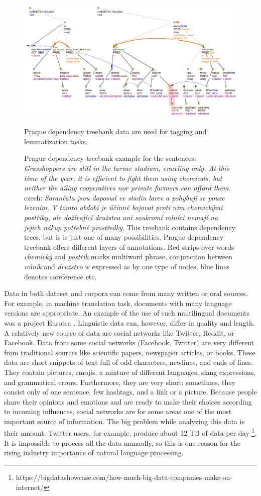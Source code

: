 \begin{figure}
\includegraphics[width=1\textwidth]{../img/prague_dep_treebank.png}
\caption{
Prague dependency treebank example \cite{PDT35} for the sentences:
\textit{Grasshoppers are still in the larvae stadium, crawling only. At this time of the year, it is efficient to fight them using chemicals, but neither the ailing cooperatives nor private farmers can afford them.} czech: \textit{Sarančata jsou doposud ve stadiu larev a pohybují se pouze lezením. V tomto období je účinné bojovat proti nim chemickými postřiky, ale dožívající družstva ani soukromí rolníci nemají na jejich nákup potřebné prostředky}. This treebank contains dependency trees, but is is just one of many possibilities. Prague dependency treebank offers different layers of annotations. Red strips over words \textit{chemický} and \textit{postřik} marks multiword phrase, conjunction between \textit{rolník} and \textit{družstvo} is expressed as by one type of nodes, blue lines denotes coreference etc.} Praque dependency treebank data are used for tagging and lemmatization tasks.
\label{fig:pdt}
\end{figure}

Data in both dataset and corpora can come from many written or oral sources. For example, in machine translation task, documents with many language versions are appropriate. An example of the use of such multilingual documents was a project Eurotra \citep{oakley1995final}. Linguistic data can, however,  differ in quality and length.  A relatively new source of data are social networks like Twitter, Reddit, or Facebook. Data from some social networks (Facebook, Twitter) are very different from traditional sources like scientific papers, newspaper articles, or books.  These data are short snippets of text full of odd characters, newlines, and ends of lines. They contain pictures, emojis, a mixture of different languages, slang expressions, and grammatical errors. Furthermore, they are very short; sometimes, they consist only of one sentence, few hashtags, and a link or a picture. Because people share their opinions and emotions and are ready to make their choices according to incoming influences, social networks are for some areas one of the most important source of information. The big problem while analyzing this data is their amount. Twitter users, for example, produce about 12 TB of data per day \footnote{https://bigdatashowcase.com/how-much-big-data-companies-make-on-internet/}. It is impossible to process all the data manually, so this is one reason for the rising industry importance of natural language processing.


